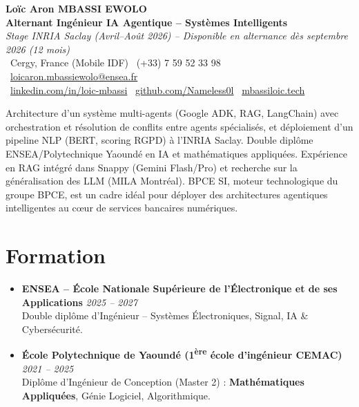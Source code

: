 \documentclass[a4paper,11pt]{article}
\begin{document}
\begin{center}
    {\Large \textbf{Lo\"ic Aron MBASSI EWOLO}} \\ \vspace{4pt}
    \textbf{\large Alternant Ing\'enieur IA Agentique -- Syst\`emes Intelligents} \\
    \textit{\small Stage INRIA Saclay (Avril--Ao\^ut 2026) -- Disponible en alternance d\`es septembre 2026 (12 mois)} \\ \vspace{4pt}
    \small
    \faMapMarker\ Cergy, France (Mobile IDF) \quad \faPhone\ (+33) 7 59 52 33 98 \quad
    {\color{primary}\faEnvelope\ \href{mailto:loicaron.mbassiewolo@ensea.fr}{loicaron.mbassiewolo@ensea.fr}} \\ \vspace{2pt}
    {\color{primary}\faLinkedin\ \href{https://www.linkedin.com/in/loic-mbassi/}{linkedin.com/in/loic-mbassi}} \quad
    {\color{primary}\faGithub\ \href{https://github.com/Nameless0l}{github.com/Nameless0l}} \quad
    {\color{primary}\faGlobe\ \href{https://mbassiloic.tech}{mbassiloic.tech}}
\end{center}
\vspace{-6pt}
\noindent\small{Architecture d'un syst\`eme multi-agents (Google ADK, RAG, LangChain) avec orchestration et résolution de conflits entre agents spécialisés, et déploiement d'un pipeline NLP (BERT, scoring RGPD) à l'INRIA Saclay. Double diplôme ENSEA/Polytechnique Yaoundé en IA et mathématiques appliquées. Expérience en RAG intégré dans Snappy (Gemini Flash/Pro) et recherche sur la généralisation des LLM (MILA Montréal). BPCE SI, moteur technologique du groupe BPCE, est un cadre idéal pour déployer des architectures agentiques intelligentes au c\oe{}ur de services bancaires numériques.}

\section{Formation}
\begin{itemize}[leftmargin=*, label=\tiny$\bullet$, nosep]
    \item \textbf{ENSEA -- \'Ecole Nationale Sup\'erieure de l'\'Electronique et de ses Applications} \hfill \textit{2025 -- 2027} \\
    \small{Double dipl\^ome d'Ing\'enieur -- Syst\`emes \'Electroniques, Signal, IA \& Cybersécurité.}
    \item \textbf{\'Ecole Polytechnique de Yaound\'e (1\textsuperscript{\`ere} \'ecole d'ing\'enieur CEMAC)} \hfill \textit{2021 -- 2025} \\
    \small{Dipl\^ome d'Ing\'enieur de Conception (Master 2) : \textbf{Math\'ematiques Appliqu\'ees}, G\'enie Logiciel, Algorithmique.}
\end{itemize}
\end{document}
